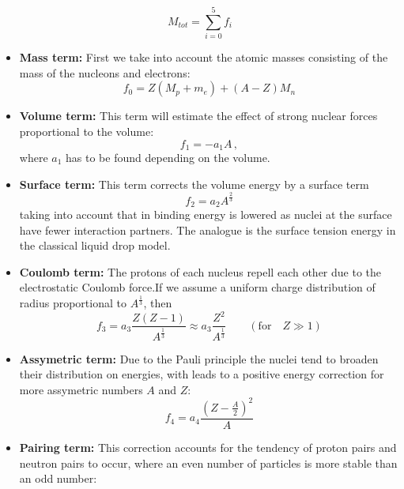 \begin{equation}
    M_{tot} = \sum_{i=0}^{5} f_i 
\end{equation}
\begin{itemize}
    \item \textbf{Mass term:} 
First we take into account the atomic masses 
consisting of the mass of the nucleons and electrons:
\begin{equation}
    f_0 = Z(M_p + m_e) + (A-Z)M_n
\end{equation}
    \item \textbf{Volume term:} This term will estimate the effect of strong 
        nuclear forces proportional to the volume:
        \begin{equation}
            f_1 = -a_1 A\, ,
        \end{equation}
        where $a_1$ has to be found depending on the volume. 
    \item \textbf{Surface term:} 
        This term corrects the volume energy by a surface term
        \begin{equation}
            f_2 = a_2 A^{\frac{2}{3}} 
        \end{equation}
        taking into account that in binding energy is lowered as nuclei at the surface 
        have fewer interaction partners. The analogue is the surface tension energy 
        in the classical liquid drop model.
    \item \textbf{Coulomb term:} The protons of each nucleus repell each other due to the 
        electrostatic Coulomb force.If we assume a uniform charge distribution of 
        radius proportional to $A^{\frac{1}{3}}$, then
        \begin{equation}
            f_3 = a_3 \frac{Z(Z-1)}{A^{\frac{1}{3}}} \approx a_3 \frac{Z^2}{A^{\frac{1}{3}}} 
            \qquad (\text{for} \quad Z \gg 1)
        \end{equation}
    \item \textbf{Assymetric term:} Due to the Pauli principle the nuclei tend to broaden their distribution
        on energies, with leads to a positive energy correction for more assymetric numbers $A$ and $Z$:
        \begin{equation}
            f_4 = a_4 \frac{(Z- \frac{A}{2})^2}{A}
        \end{equation}
    \item \textbf{Pairing term:} This correction accounts for the tendency of proton pairs and neutron pairs
        to occur, where an even number of particles is more stable than an odd number:

\end{itemize}

